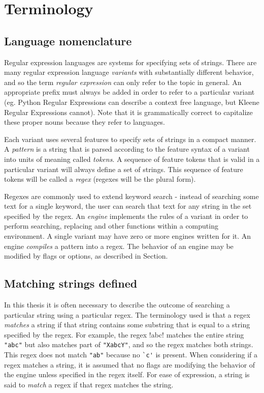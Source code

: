 \section{Terminology}

\subsection{Language nomenclature}
\label{sec:nomenclature}
Regular expression languages are systems for specifying sets of strings.  There are many regular expression language \emph{variants} with substantially different behavior, and so the term \emph{regular expression} can only refer to the topic in general.  An appropriate prefix must always be added in order to refer to a particular variant (eg. Python Regular Expressions can describe a context free language, but Kleene Regular Expressions cannot).  Note that it is grammatically correct to capitalize these proper nouns because they refer to languages.

Each variant uses several features to specify sets of strings in a compact manner.  A \emph{pattern} is a string that is parsed according to the feature syntax of a variant into units of meaning called \emph{tokens}.  A sequence of feature tokens that is valid in a particular variant will always define a set of strings.  This sequence of feature tokens will be called a \emph{regex} (regexes will be the plural form).

Regexes are commonly used to extend keyword search - instead of searching some text for a single keyword, the user can search that text for any string in the set specified by the regex.   An \emph{engine} implements the rules of a variant in order to perform searching, replacing and other functions within a computing environment.  A single variant may have zero or more engines written for it.  An engine \emph{compiles} a pattern into a regex.  The behavior of an engine may be modified by flags or options, as described in Section.

\subsection{Matching strings defined}
\label{sec:matchingDefined}
In this thesis it is often necessary to describe the outcome of searching a particular string using a particular regex.  The terminology used is that a regex \emph{matches} a string if that string contains some substring that is equal to a string specified by the regex.  For example, the regex \cverb!abc! matches the entire string \verb!"abc"! but also matches part of \verb!"XabcY"!, and so the regex matches both strings.  This regex does not match \verb!"ab"! because no \verb!`c'! is present.  When considering if a regex matches a string, it is assumed that no flags are modifying the behavior of the engine unless specified in the regex itself.  For ease of expression, a string is said to \emph{match} a regex if that regex matches the string.


